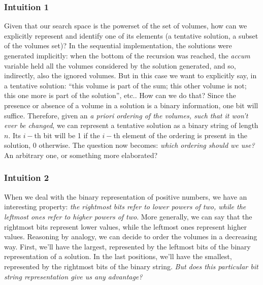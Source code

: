 \documentclass[12pt]{extarticle}
\begin{document}
\subsubsection{Intuition 1}
Given that our search space is the powerset of the set of volumes, how can we explicitly represent and identify one of its elements (a tentative solution, a subset of the volumes set)? In the sequential implementation, the solutions were generated implicitly: when the bottom of the recursion was reached, the \emph{accum} variable held all the volumes considered by the solution generated, and so, indirectly, also the ignored volumes. But in this case we want to explicitly say, in a tentative solution: ``this volume is part of the sum; this other volume is not; this one more is part of the solution'', etc.. How can we do that?\newline
Since the presence or absence of a volume in a solution is a binary information, one bit will suffice. Therefore, given an \emph{a priori ordering of the volumes, such that it won't ever be changed}, we can represent a tentative solution as a binary string of length $n$. Its $i-$th bit will be 1 if the $i-$th element of the ordering is present in the solution, 0 otherwise. The question now becomes: \emph{which ordering should we use?} An arbitrary one, or something more elaborated?
\subsubsection{Intuition 2}
When we deal with the binary representation of positive numbers, we have an interesting property: \emph{the rightmost bits refer to lower powers of two, while the leftmost ones refer to higher powers of two}. More generally, we can say that the rightmost bits represent lower values, while the leftmost ones represent higher values. Reasoning by analogy, we can decide to order the volumes in a decreasing way. First, we'll have the largest, represented by the leftmost bits of the binary representation of a solution. In the last positions, we'll have the smallest, represented by the rightmost bits of the binary string. \emph{But does this particular bit string representation give us any advantage?}
\end{document}
